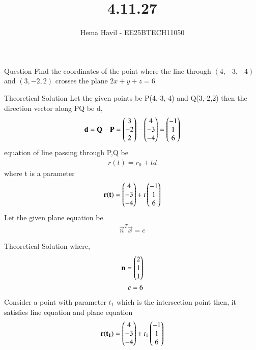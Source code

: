\documentclass{beamer}
\title %
{4.11.27}
\author %
{Hema Havil - EE25BTECH11050}
\begin{document}
	
	\frame{\titlepage}
	\begin{frame}{Question}
		 Find the coordinates of the point where the line through $(4,-3,-4)$ and $(3,-2,2)$ crosses the plane $2x+y+z=6$
         \end{frame}
\begin{frame}{Theoretical Solution}
         Let the given points be P(4,-3,-4) and Q(3,-2,2) then the direction vector along PQ be d, 
         \begin{align}
             \mathbf{d}=\mathbf{Q}-\mathbf{P}=\begin{pmatrix}3\\-2\\2\end{pmatrix}-\begin{pmatrix}4\\-3\\-4\end{pmatrix}=\begin{pmatrix}-1\\1\\6\end{pmatrix}
         \end{align}
         equation of line passing through P,Q be
         \begin{align}
             r(t)=r_0+td
         \end{align}
         where t is a parameter
         \begin{align}
             \mathbf{r(t)}=\begin{pmatrix}4\\-3\\-4\end{pmatrix}+t\begin{pmatrix}-1\\1\\6\end{pmatrix}
         \end{align}
         Let the given plane equation be 
         \begin{align}
             \vec{n}^T\vec{x}=c 
         \end{align}
         
         
\end{frame}
\begin{frame}{Theoretical Solution}
         where, 
         \begin{align}
             \mathbf{n}=\begin{pmatrix}2\\1\\1\end{pmatrix}\\
             c=6
         \end{align}
         Consider a point with parameter $t_1$ which is the intersection point then, it satisfies line equation and plane equation 
         \begin{align}
             \mathbf{r(t_1)}=\begin{pmatrix}4\\-3\\-4\end{pmatrix}+t_1\begin{pmatrix}-1\\1\\6\end{pmatrix}
         \end{align}
         
         
\end{frame}
\end{document}
